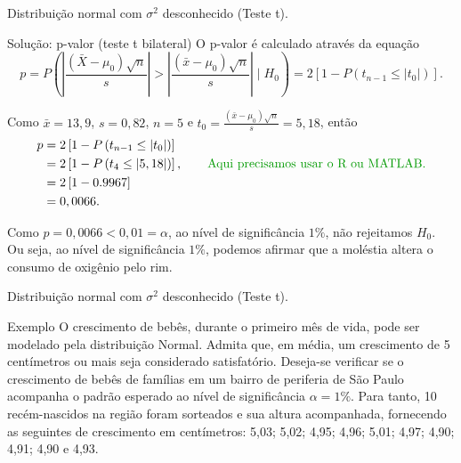 \documentclass[8pt]{beamer}
\begin{document}
\begin{frame}{Distribuição normal com $\sigma^2$ desconhecido (Teste t).}

\begin{block}{Solução: p-valor (teste t bilateral)}
	O p-valor é calculado através da equação
	$$p=P\left( \left\lvert \frac{(\bar{X} - \mu_0)\sqrt{n}}{s} \right\rvert >  \left\lvert \frac{(\bar{x} - \mu_0)\sqrt{n}}{s}  \right\rvert \mid H_0 \right) = 2 \left[ 1 - P\left( t_{n-1} \leq \lvert t_0 \rvert \right) \right].$$
	
	Como $\bar{x} = 13,9$, $s=0,82$, $n=5$ e $t_0 = \frac{(\bar{x} -\mu_0)\sqrt{n}}{s} = 5,18$, então
	\begin{align*}
		p &= 2 \left[ 1 - P\left( t_{n-1} \leq \lvert t_0 \rvert \right) \right]\\
		&= 2 \left[ 1 - P\left( t_{4} \leq \lvert 5,18 \rvert \right) \right], \qquad \mbox{\textcolor{important}{Aqui precisamos usar o R ou MATLAB.}} \\
		&= 2 \left[ 1- 0.9967 \right]\\
		&= 0,0066.
	\end{align*}
	
	Como $p=0,0066 < 0,01 = \alpha$, ao nível de significância $1\%$, não rejeitamos $H_0$. Ou seja, ao nível de significância $1\%$, podemos afirmar que a moléstia altera o consumo de oxigênio pelo rim.
\end{block}

\end{frame}

\begin{frame}{Distribuição normal com $\sigma^2$ desconhecido (Teste t).}

\large
 \begin{block}{Exemplo}
	O crescimento de bebês, durante o primeiro mês de vida, pode ser modelado pela distribuição Normal. Admita que, em média, um crescimento de 5 centímetros ou mais seja considerado satisfatório. Deseja-se verificar se o crescimento de bebês de famílias em um bairro de periferia de São Paulo acompanha o padrão esperado ao nível de significância $\alpha=1\%$. Para tanto, 10 recém-nascidos na região foram sorteados e sua altura acompanhada, fornecendo as seguintes de crescimento em centímetros: 5,03; 5,02; 4,95; 4,96; 5,01; 4,97; 4,90; 4,91; 4,90 e 4,93.
\end{block}


\normalsize

\end{frame}
\end{document}
